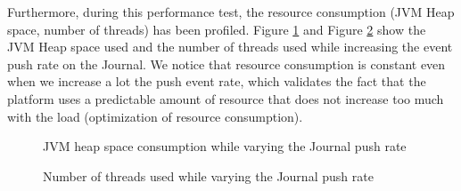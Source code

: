 Furthermore, during this performance test, the resource consumption (JVM Heap space, number of threads) has been profiled. Figure \ref{fig:plotheapspace} and Figure \ref{fig:plotthreads} show the JVM Heap space used and the number of threads used while increasing the event push rate on the Journal. We notice that resource consumption is constant even when we increase a lot the push event rate, which validates the fact that the platform uses a predictable amount of resource that does not increase too much with the load (optimization of resource consumption).

\begin{figure}[h]
  \begin{center} 
    \caption{JVM heap space consumption while varying the Journal push rate}
    \label{fig:plotheapspace}
  \end{center}
\end{figure}

\begin{figure}[h]
  \begin{center} 
    \caption{Number of threads used while varying the Journal push rate}
    \label{fig:plotthreads}
  \end{center}
\end{figure}


